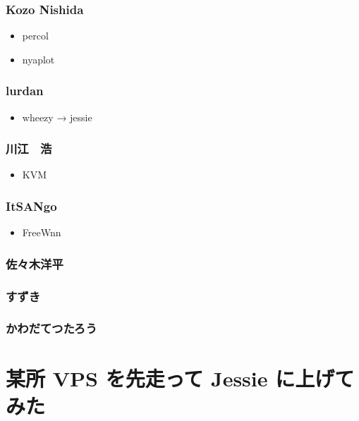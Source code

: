 \documentclass[cjk,dvipdfmx,10pt,compress,%
hyperref={bookmarks=true,bookmarksnumbered=true,bookmarksopen=false,%
colorlinks=false,%
pdftitle={第 96 回 関西 Debian 勉強会},%
pdfauthor={倉敷・のがた・佐々木・かわだ},%
pdfsubject={資料},%
}]{beamer}
\begin{document}
\begin{frame}
  \frametitle{ Kozo Nishida }
  \begin{itemize}
  \item percol
  \item nyaplot
  \end{itemize}
\end{frame}

\begin{frame}
  \frametitle{ lurdan }
  \begin{itemize}
  \item wheezy → jessie
  \end{itemize}
\end{frame}

\begin{frame}
  \frametitle{ 川江　浩 }
  \begin{itemize}
  \item KVM
  \end{itemize}
\end{frame}

\begin{frame}
  \frametitle{ ItSANgo }
  \begin{itemize}
  \item FreeWnn
  \end{itemize}
\end{frame}

\begin{frame}
  \frametitle{ 佐々木洋平 }
\end{frame}

\begin{frame}
  \frametitle{ すずき }
\end{frame}

\begin{frame}
  \frametitle{ かわだてつたろう }
\end{frame}



\section{某所 VPS を先走って Jessie に上げてみた}
\end{document}
